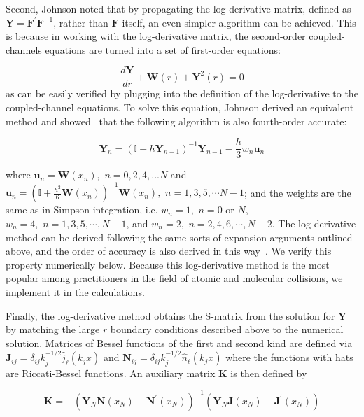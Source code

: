 \documentclass[%
 reprint,
 amsmath,amssymb,
 aps,
 nofootinbib
]{revtex4-1}
\begin{document}
\noindent Second, Johnson noted that by propagating the log-derivative matrix, defined as $\mathbf{Y} = \mathbf{F}^\prime \mathbf{F}^{-1}$, rather than $\mathbf{F}$ itself, an even simpler algorithm can be achieved. This is because in working with the log-derivative matrix, the second-order coupled-channels equations are turned into a set of first-order equations:

\begin{equation}
\frac{d \mathbf{Y}}{dr} + \mathbf{W}(r) + \mathbf{Y}^2(r) = 0
\label{eq:LogDerivEq}
\end{equation} 
\noindent as can be easily verified by plugging into the definition of the log-derivative to the coupled-channel equations. To solve this equation, Johnson derived an equivalent method and showed~\cite{Johnson73,JohnsonNumerov} that the following algorithm is also fourth-order accurate:

\begin{equation}
\mathbf{Y}_n = \left(\mathbb{I} + h \mathbf{Y}_{n-1}\right)^{-1} \mathbf{Y}_{n-1} - \frac{h}{3} w_n \mathbf{u}_n
\end{equation}

\noindent where $\mathbf{u}_n = \mathbf{W}(x_n), \,\, n = 0, 2,4,...N$ and $\mathbf{u}_n = \left( \mathbb{I} + \frac{h^2}{6} \mathbf{W}(x_n)\right)^{-1} \mathbf{W}(x_n),\,\,  n = 1, 3, 5, \cdots N-1$; and the weights are the same as in Simpson integration, i.e. $w_n = 1,\,\,  n = 0\text{ or } N$, $w_n = 4, \,\, n = 1, 3, 5, \cdots, N-1$, and $w_n = 2, \,\, n = 2, 4, 6, \cdots, N-2$. The log-derivative method can be derived following the same sorts of expansion arguments outlined above, and the order of accuracy is also derived in this way~\cite{ManJohnsonRederived,Johnson73,JohnsonNumerov,Friedman95}. We verify this property numerically below. Because this log-derivative method is the most popular among practitioners in the field of atomic and molecular collisions, we implement it in the calculations.

Finally, the log-derivative method obtains the S-matrix from the solution for $\mathbf{Y}$ by matching the large $r$ boundary conditions described above to the numerical solution. Matrices of Bessel functions of the first and second kind are defined via $\mathbf{J}_{ij} = \delta_{ij} k_j^{-1/2} \hat{j}_\ell(k_j x)$ and $\mathbf{N}_{ij} = \delta_{ij} k_j^{-1/2} \hat{n}_\ell(k_j x)$ where the functions with hats are Riccati-Bessel functions. An auxiliary matrix $\mathbf{K}$ is then defined by 

\begin{equation}
\mathbf{K} = -\left(\mathbf{Y}_N \mathbf{N}(x_N) - \mathbf{N}^\prime(x_N)\right)^{-1}  \left(\mathbf{Y}_N \mathbf{J}(x_N) - \mathbf{J}^\prime(x_N)\right)
\end{equation}
\end{document}
